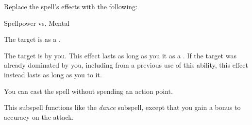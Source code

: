 


Replace the spell's effects with the following:
\begin{spellcontent}

\begin{augmenteffects}




\begin{spellattack}{Spellpower vs. Mental}


\spellsuccess
The target is  as a .



\spellcritical
The target is  by you.
This effect lasts as long as you  it as a .
If the target was already dominated by you, including from a previous use of this ability, this effect instead lasts as long as you  to it.



\end{spellattack}





\end{augmenteffects}

\end{spellcontent}





You can cast the spell without spending an action point.






This subspell functions like the \textit{dance} subspell, except that you gain a  bonus to accuracy on the attack.





